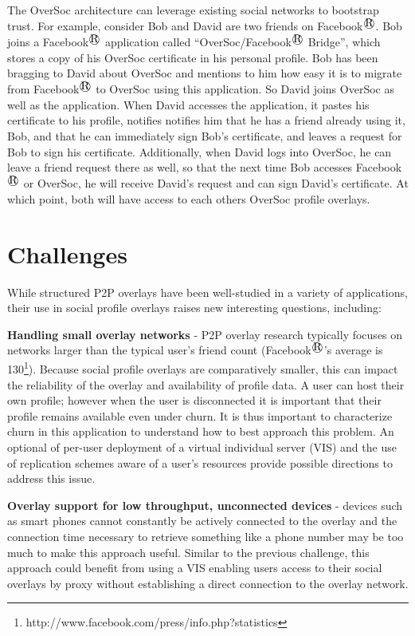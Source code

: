 The OverSoc architecture can leverage existing social networks to bootstrap
trust.  For example, consider Bob and David are two friends on Facebook$^\registered$.  Bob
joins a Facebook$^\registered$ application called ``OverSoc/Facebook$^\registered$ Bridge'', which stores
a copy of his OverSoc certificate in his personal profile.  Bob has been
bragging to David about OverSoc and mentions to him how easy it is to migrate
from Facebook$^\registered$ to OverSoc using this application.  So David joins OverSoc as
well as the application.  When David accesses the application, it pastes his
certificate to his profile, notifies notifies him that he has a friend already
using it, Bob, and that he can immediately sign Bob's certificate, and leaves a
request for Bob to sign his certificate.  Additionally, when David logs into
OverSoc, he can leave a friend request there as well, so that the next time
Bob accesses Facebook$^\registered$ or OverSoc, he will receive David's request and can sign
David's certificate.  At which point, both will have access to each others
OverSoc profile overlays.  

\section{Challenges}
\label{vpo:outstanding}

While structured P2P overlays have been well-studied in a variety of
applications, their use in social profile overlays raises new interesting
questions, including:

{\bf Handling small overlay networks} - P2P overlay research typically focuses
on networks larger than the typical user's friend count (Facebook$^\registered$'s average is
130\footnote{http://www.facebook.com/press/info.php?statistics}).  Because
social profile overlays are comparatively smaller, this can impact the
reliability of the overlay and availability of profile data.  A user can host
their own profile; however when the user is disconnected it is important that
their profile remains available even under churn. It is thus important to
characterize churn in this application to understand how to best approach this
problem. An optional of per-user deployment of a virtual individual server
(VIS) and the use of replication schemes aware of a user's resources provide
possible directions to address this issue.

{\bf Overlay support for low throughput, unconnected devices} - devices such as
smart phones cannot constantly be actively connected to the overlay and the
connection time necessary to retrieve something like a phone number may be too
much to make this approach useful.  Similar to the previous challenge, this
approach could benefit from using a VIS enabling users access to their social
overlays by proxy without establishing a direct connection to the overlay
network.

